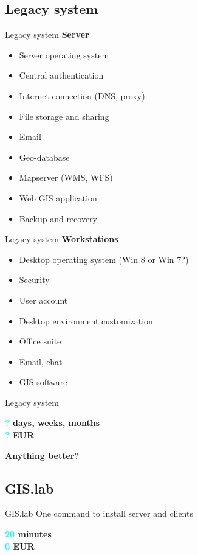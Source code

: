 \documentclass[12pt]{beamer}
\begin{document}
\subsection{Legacy system}
\begin{frame}{Legacy system}
	\textbf{Server}
	\begin{itemize}[<+->]
		\item Server operating system
		\item Central authentication
		\item Internet connection (DNS, proxy)
		\item File storage and sharing
		\item Email
		\item Geo-database
		\item Mapserver (WMS, WFS)
		\item Web GIS application
		\item Backup and recovery
	\end{itemize}
\end{frame}


\begin{frame}{Legacy system}
	\textbf{Workstations}
	\begin{itemize}[<+->]
		\item Desktop operating system (Win 8 or Win 7?)
		\item Security
		\item User account
		\item Desktop environment customization
		\item Office suite
		\item Email, chat
		\item GIS software
	\end{itemize}
\end{frame}


\begin{frame}{Legacy system}
	\begin{flushleft}
		\textbf{\textcolor{Cyan}{?} days, weeks, months} \\
		\textbf{\textcolor{Cyan}{?} EUR} \\
	\end{flushleft}
\end{frame}


\begin{frame}
	\LARGE \textbf{Anything better?}
\end{frame}


\subsection{GIS.lab}
\begin{frame}{GIS.lab}
	One command to install server and clients
	\begin{flushleft}
		\textbf{\textcolor{Cyan}{20} minutes} \\
		\textbf{\textcolor{Cyan}{0} EUR} \\
	\end{flushleft}
\end{frame}
\end{document}
